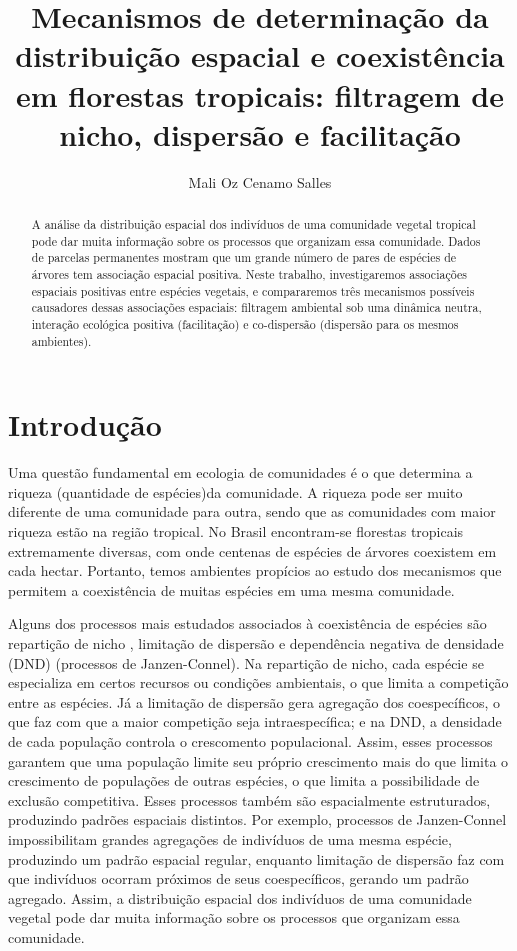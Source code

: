 \documentclass[twoside,12pt,a4paper]{report}
\begin{document}
\title{Mecanismos de determinação da distribuição espacial e coexistência em florestas tropicais:
filtragem de nicho, dispersão e facilitação}
\author{Mali Oz Cenamo Salles}


\begin{abstract}

A análise da distribuição espacial dos indivíduos de uma comunidade vegetal tropical pode dar muita
informação sobre os processos que organizam essa comunidade. Dados de parcelas permanentes mostram
que um grande número de pares de espécies de árvores tem associação espacial positiva. Neste
trabalho, investigaremos associações espaciais positivas entre espécies vegetais, e compararemos
três mecanismos possíveis causadores dessas associações espaciais: filtragem ambiental sob uma
dinâmica neutra, interação ecológica positiva (facilitação) e co-dispersão (dispersão para os mesmos
ambientes).

\end{abstract}

\section{Introdução}

Uma questão fundamental em ecologia de comunidades é o que determina a riqueza (quantidade de
espécies)da comunidade. 
A riqueza pode ser muito diferente de uma comunidade para outra, sendo que as comunidades com
maior riqueza estão na região tropical.
No Brasil encontram-se florestas tropicais extremamente diversas, com onde centenas de
espécies de árvores coexistem em cada hectar. Portanto, temos ambientes propícios ao estudo dos mecanismos
que permitem a coexistência de muitas espécies em uma mesma comunidade.

Alguns dos processos mais estudados associados à coexistência de espécies são repartição de
nicho \citep{Hutchinson1957}, limitação de dispersão \citep{HurttPacala1995} e dependência
negativa de densidade (DND)
(processos de Janzen-Connel)\citep{Janzen1970}. 
Na repartição de nicho, cada espécie se especializa em certos recursos ou condições
ambientais, o que limita a competição entre as espécies. Já a limitação de dispersão gera
agregação dos coespecíficos, o que faz com que a maior competição seja intraespecífica; e na
DND, a densidade de cada população controla o crescomento populacional.
Assim, esses processos garantem que uma população limite seu próprio crescimento mais do que limita o
crescimento de populações de outras espécies, o que limita a possibilidade de exclusão
competitiva.
Esses processos também são espacialmente
estruturados, produzindo padrões espaciais distintos. Por exemplo, processos de
Janzen-Connel impossibilitam grandes agregações de indivíduos de uma mesma espécie,
produzindo um padrão espacial regular, enquanto limitação de dispersão faz com que
indivíduos ocorram próximos de seus coespecíficos, gerando um padrão agregado.
Assim, a distribuição espacial dos indivíduos de uma comunidade vegetal pode dar muita
informação sobre os processos que organizam essa comunidade. 
\end{document}
